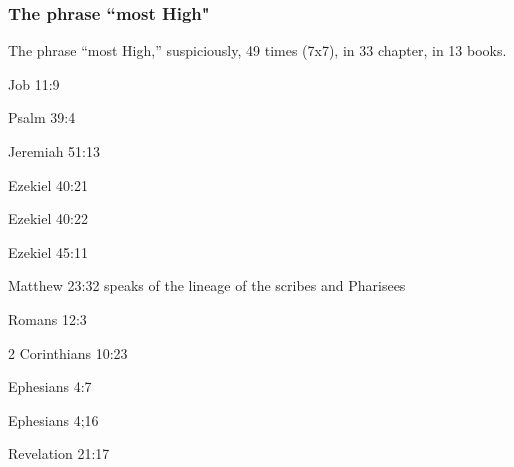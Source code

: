\subsubsection{The phrase ``most High"}

The phrase ``most High,'' suspiciously, 49 times (7x7), in 33 chapter, in 13 books.

\begin{compactenum}
    \item Job  11:9
    \item Psalm 39:4
    \item Jeremiah 51:13
    \item Ezekiel 40:21
    \item Ezekiel 40:22
    \item Ezekiel 45:11
    \item Matthew 23:32 speaks of the lineage of the scribes and Pharisees
    \item Romans 12:3
    \item 2 Corinthians  10:23
    \item Ephesians 4:7
    \item Ephesians 4;16
    \item Revelation 21:17
\end{compactenum}